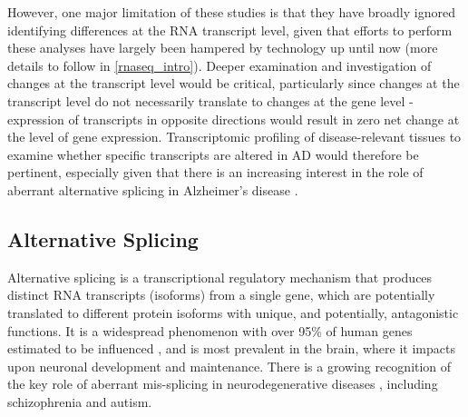 However, one major limitation of these studies is that they have broadly ignored identifying differences at the RNA transcript level, given that efforts to perform these analyses have largely been hampered by technology up until now (more details to follow in \cref{rnaseq_intro}). Deeper examination and investigation of changes at the transcript level would be critical, particularly since changes at the transcript level do not necessarily translate to changes at the gene level - expression of transcripts in opposite directions would result in zero net change at the level of gene expression. Transcriptomic profiling of disease-relevant tissues to examine whether specific transcripts are altered in AD would therefore be pertinent, especially given that there is an increasing interest in the role of aberrant alternative splicing in Alzheimer's disease \cite{Raj2018}.

\subsection{Alternative Splicing}\label{intro:AS}
Alternative splicing is a transcriptional regulatory mechanism that produces distinct RNA transcripts (isoforms) from a single gene, which are potentially translated to different protein isoforms with unique, and potentially, antagonistic functions\cite{Wang2008}. It is a widespread phenomenon with over 95\% of human genes estimated to be influenced \cite{Pan2008}, and is most prevalent in the brain\cite{Yeo2004}, where it impacts upon neuronal development and maintenance\cite{Pan2008, Mazin2014, Raj2015}. There is a growing recognition of the key role of aberrant mis-splicing in neurodegenerative diseases \cite{Gandal2018,RL2019}, including schizophrenia and autism. 

